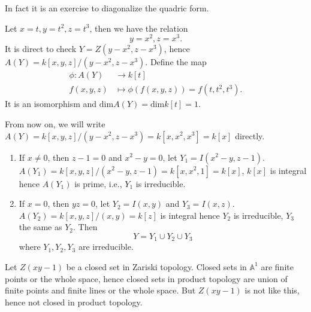 \begin{remark}
  In fact it is an exercise to diagonalize the quadric form. 
\end{remark}
\begin{solution}
  Let $x=t,y=t^2,z=t^3$, then we have the relation
  \[
  y=x^2,z=x^3.
  \]
  It is direct to check $Y=Z\left( y-x^2,z-x^3 \right)$, hence $A(Y) = k[x,y,z]/\left( y-x^2,z-x^3 \right) $. Define the map
  \begin{align*}
    \phi: A(Y) &\longrightarrow k[t] \\
    f(x,y,z) &\longmapsto \phi(f(x,y,z)) = f(t,t^2,t^3)
  .\end{align*}
  It is an isomorphism and $\mathrm{dim}A(Y)=\mathrm{dim}k[t]=1$.
\end{solution}
\begin{remark}
  From now on, we will write $A(Y)=k[x,y,z]/(y-x^2,z-x^3)=k[x,x^2,x^3]=k[x]$ directly.
\end{remark}
\begin{solution}
  \begin{enumerate}
    \item If $x\neq 0$, then $z-1=0$ and $x^2-y=0$, let $Y_1=I(x^2-y,z-1)$. $A(Y_1)=k[x,y,z]/(x^2-y,z-1)=k[x,x^2,1]=k[x]$, $k[x]$ is integral hence $A(Y_1)$ is prime, i.e., $Y_1$ is irreducible.
    \item If $x=0$, then $yz=0$, let $Y_2=I(x,y)$ and $Y_3=I(x,z)$. $A(Y_2)=k[x,y,z]/(x,y)=k[z]$ is integral hence $Y_2$ is irreducible, $Y_3$ the same as $Y_2$. Then 
      \[
      Y=Y_1\cup Y_2\cup Y_3
      \] 
      where $Y_1,Y_2,Y_3$ are irreducible.
  \end{enumerate}
\end{solution}
\begin{solution}
  Let $Z(xy-1)$ be a closed set in Zariski topology. Closed sets in $\mathbb{A}^{1}$ are finite points or the whole space, hence closed sets in product topology are union of finite points and finite lines or the whole space. But $Z(xy-1)$ is not like this, hence not closed in product topology.
\end{solution}


